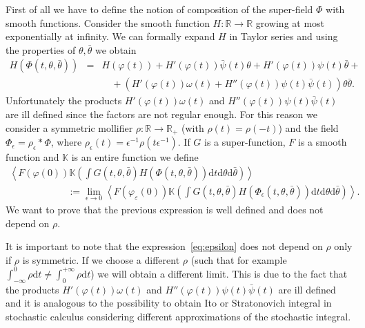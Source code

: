 \documentclass[a4paper,10pt]{article}
\newcommand{\assign}{:=}
\newcommand{\mathd}{\mathrm{d}}
\begin{document}
First of all we have to define the notion of composition of the super-field
$\Phi$ with smooth functions. Consider the smooth function $H : \mathbb{R}
\rightarrow \mathbb{R}$ growing at most exponentially at infinity. We can
formally expand $H$ in Taylor series and using the properties of $\theta,
\bar{\theta}$ we obtain
\[ \begin{array}{rcl}
     H (\Phi (t, \theta, \bar{\theta})) & = & H (\varphi (t)) + H' (\varphi
     (t)) \bar{\psi} (t) \theta + H' (\varphi (t)) \psi (t) \bar{\theta} +\\
     &  & \quad + (H' (\varphi (t)) \omega (t) + H'' (\varphi (t)) \psi (t)
     \bar{\psi} (t)) \theta \bar{\theta} .
   \end{array} \]
Unfortunately the products $H' (\varphi (t)) \omega (t)$ and $H'' (\varphi
(t)) \psi (t) \bar{\psi} (t)$ are ill defined since the factors are not
regular enough. For this reason we consider a symmetric mollifier $\rho :
\mathbb{R} \rightarrow \mathbb{R}_+$ (with $\rho (t) = \rho (- t)$) and the
field $\Phi_{\epsilon} = \rho_{\epsilon} \ast \Phi$, where $\rho_{\epsilon}
(t) = \epsilon^{- 1} \rho (t \epsilon^{- 1})$. If $G$ is a super-function, $F$
is a smooth function and $\mathbb{K}$ is an entire function we define
\begin{equation}
  \begin{array}{l}
    \left\langle F (\varphi (0)) \mathbb{K} \left( \int G (t, \theta,
    \bar{\theta}) H (\Phi (t, \theta, \bar{\theta})) \mathd t \mathd \theta
    \mathd \bar{\theta} \right) \right\rangle\\
    \qquad \qquad \qquad \assign \lim_{\epsilon \rightarrow 0} \left\langle F
    (\varphi_{\varepsilon} (0)) \mathbb{K} \left( \int G (t, \theta,
    \bar{\theta}) H (\Phi_{\epsilon} (t, \theta, \bar{\theta})) \mathd t
    \mathd \theta \mathd \bar{\theta} \right) \right\rangle .
  \end{array} \label{eq:epsilon}
\end{equation}
We want to prove that the previous expression is well defined and does not
depend on $\rho$.

\begin{remark}
  It is important to note that the expression~{\eqref{eq:epsilon}} does not
  depend on $\rho$ only if $\rho$ is symmetric. If we choose a different
  $\rho$ (such that for example $\int_{- \infty}^0 \rho \mathd t \not =
  \int_0^{+ \infty} \rho \mathd t$) we will obtain a different limit. This is
  due to the fact that the products $H' (\varphi (t)) \omega (t)$ and $H''
  (\varphi (t)) \psi (t) \bar{\psi} (t)$ are ill defined and it is analogous
  to the possibility to obtain Ito or Stratonovich integral in stochastic
  calculus considering different approximations of the stochastic integral.
\end{remark}
\end{document}
